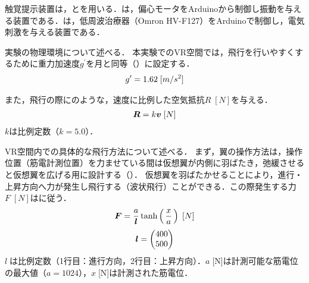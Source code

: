 \begin{small}
        触覚提示装置は，とを用いる．は，偏心モータをArduinoから制御し振動を与える装置である．は，低周波治療器（Omron HV-F127\cite{Omron-HV-F127}）をArduinoで制御し，電気刺激を与える装置である．

        実験の物理環境について述べる．
        本実験でのVR空間では，飛行を行いやすくするために重力加速度$g^{\prime}$を月と同等（）に設定する．
        \begin{eqnarray}
                \equlabel{gravity}
                g^{\prime}=1.62\;[m/s^{2}]
        \end{eqnarray}

        また，飛行の際にのような，速度に比例した空気抵抗$R\;[N]$を与える．
        \begin{eqnarray}
                \equlabel{air_resistance}
                \bm{R}=k\bm{v} \;[N]
        \end{eqnarray}
        $k$は比例定数（$k=5.0$）．


        VR空間内での具体的な飛行方法について述べる．
        まず，翼の操作方法は，操作位置（筋電計測位置）を力ませている間は仮想翼が内側に羽ばたき，弛緩させると仮想翼を広げる用に設計する（）．
        仮想翼を羽ばたかせることにより，進行・上昇方向へ力が発生し飛行する（波状飛行\cite{bird-flying}）ことができる．この際発生する力$F\;[N]$はに従う．
        \begin{eqnarray}
                \equlabel{force}
                \bm{F}=\frac{a}{\bm{l}}  \tanh\left(\,\frac{x}{a}\,\right) \;[N]
        \end{eqnarray}
        \begin{eqnarray}
                \equlabel{force_prop}
                \bm{l}=\begin{pmatrix}400 \\ 500 \end{pmatrix}
        \end{eqnarray}
        $l\;$は比例定数（1行目：進行方向，2行目：上昇方向）．$a\;$[N]は計測可能な筋電位の最大値（$a=1024$），$x\;$[N]は計測された筋電位．


\end{small}
